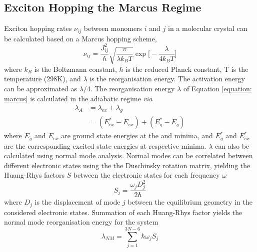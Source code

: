 \subsection{Exciton Hopping the Marcus Regime}\label{section: Connecting_Marcus}
Exciton hopping rates $\nu_{ij}$ between monomers $i$ and $j$ in a molecular crystal can be calculated based on a Marcus hopping scheme,
\begin{equation}
\nu_{ij}=\frac{J_{ij}^2}{\hbar}\sqrt{\frac{\pi}{\lambda k_{B}T}}\exp\bigg[-\frac{\lambda}{4k_{B}T}\bigg]
\label{equation: marcus}
\end{equation}
where $k_{B}$ is the Boltzmann constant, $\hbar$ is the reduced Planck
constant, T is the temperature (298K), and $\lambda$ is the reorganisation energy. The activation energy can be approximated as  $\lambda$/4.\cite{Stehr2014,Kimura2000} The reorganisation energy $\lambda$ of Equation \ref{equation: marcus} is calculated in the adiabatic regime \textit{via}
\begin{equation}
\begin{split}
\lambda_{A}&=\lambda_{ex}+\lambda_{g}\\
&=(E_{ex}^*-E_{ex})+(E_{g}^*-E_g)
\label{equation: lambda}
\end{split}
\end{equation}
where $E_g$ and $E_{ex}$ are ground state energies at the \szero{} and \sone{} minima, and $E_{g}^*$ and $E_{ex}^*$ are the corresponding excited state energies at respective minima. $\lambda$ can also be calculated using normal mode analysis. Normal modes can be correlated between different electronic states using the the Duschinsky rotation matrix, yielding the Huang-Rhys factors $S$ between the electronic states for each frequency $\omega$
\begin{equation}
S_{j}=\frac{\omega_{j}D_{j}^2}{2\hbar{}}
\end{equation}
where $D_{j}$ is the displacement of mode $j$ between the equilibrium geometry in the considered electronic states. Summation of each Huang-Rhys factor yields the normal mode reorganisation energy for the system
\begin{equation}
\lambda_{NM}=\sum_{j=1}^{3N-6}\hbar{}\omega_{j}S_{j}
\end{equation}
